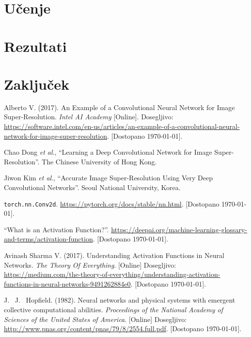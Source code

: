 \documentclass[a4paper,11pt,titlepage]{article}
\begin{document}
\section{Učenje}

\section{Rezultati}


\section{Zaključek}


\begin{thebibliography}{99}


 Alberto V\@. (2017). An Example of a Convolutional Neural Network for Image Super-Resolution.
	\emph{Intel AI Academy} [Online]. Dosegljivo:
	\url{https://software.intel.com/en-us/articles/an-example-of-a-convolutional-neural-network-for-image-super-resolution}.
	[Dostopano \today].

 Chao Dong \emph{et al}., ``Learning a Deep Convolutional Network for Image Super-Resolution''. The Chinese University of Hong Kong.

 Jiwon Kim \emph{et al}., ``Accurate Image Super-Resolution Using Very Deep Convolutional Networks''.
	Seoul National University, Korea.

 \texttt{torch.nn.Conv2d}. \url{https://pytorch.org/docs/stable/nn.html}. [Dostopano \today].

 ``What is an Activation Function?''. \url{https://deepai.org/machine-learning-glossary-and-terms/activation-function}.
	[Dostopano \today].

 Avinash Sharma V\@. (2017). Understanding Activation Functions in Neural Networks. \emph{The Theory Of Everything}.
	[Online] Dosegljivo: \url{https://medium.com/the-theory-of-everything/understanding-activation-functions-in-neural-networks-9491262884e0}.
	[Dostopano \today].

 J.~ J.~ Hopfield. (1982). Neural networks and physical systems with emergent collective computational abilities.
	\emph{Proceedings of the National Academy of Sciences of the United States of America}. [Online] Dosegljivo:
	\url{http://www.pnas.org/content/pnas/79/8/2554.full.pdf}. [Dostopano \today].


\end{thebibliography}
\end{document}
